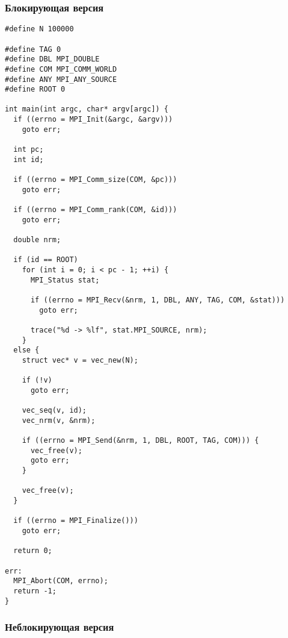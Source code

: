 \documentclass[12pt, a4paper]{article}
\begin{document}
\subsubsection{Блокирующая версия}

\begin{verbatim}
#define N 100000

#define TAG 0
#define DBL MPI_DOUBLE
#define COM MPI_COMM_WORLD
#define ANY MPI_ANY_SOURCE
#define ROOT 0

int main(int argc, char* argv[argc]) {
  if ((errno = MPI_Init(&argc, &argv)))
    goto err;

  int pc;
  int id;

  if ((errno = MPI_Comm_size(COM, &pc)))
    goto err;

  if ((errno = MPI_Comm_rank(COM, &id)))
    goto err;

  double nrm;

  if (id == ROOT)
    for (int i = 0; i < pc - 1; ++i) {
      MPI_Status stat;

      if ((errno = MPI_Recv(&nrm, 1, DBL, ANY, TAG, COM, &stat)))
        goto err;

      trace("%d -> %lf", stat.MPI_SOURCE, nrm);
    }
  else {
    struct vec* v = vec_new(N);

    if (!v)
      goto err;

    vec_seq(v, id);
    vec_nrm(v, &nrm);

    if ((errno = MPI_Send(&nrm, 1, DBL, ROOT, TAG, COM))) {
      vec_free(v);
      goto err;
    }

    vec_free(v);
  }

  if ((errno = MPI_Finalize()))
    goto err;

  return 0;

err:
  MPI_Abort(COM, errno);
  return -1;
}
\end{verbatim}

\subsubsection{Неблокирующая версия}
\end{document}
